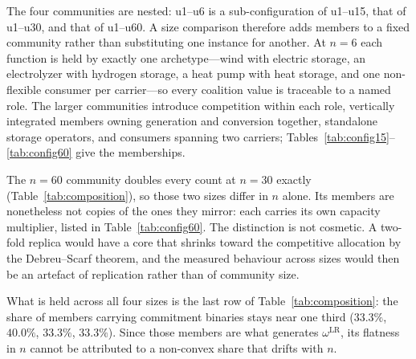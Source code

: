 The four communities are nested: u1--u6 is a sub-configuration of u1--u15, that of
u1--u30, and that of u1--u60. A size comparison therefore adds members to a fixed
community rather than substituting one instance for another. At $n=6$ each function is
held by exactly one archetype---wind with electric storage, an electrolyzer with
hydrogen storage, a heat pump with heat storage, and one non-flexible consumer per
carrier---so every coalition value is traceable to a named role. The larger communities
introduce competition within each role, vertically integrated members owning generation
and conversion together, standalone storage operators, and consumers spanning two
carriers; Tables~\ref{tab:config15}--\ref{tab:config60} give the memberships.

The $n=60$ community doubles every count at $n=30$ exactly (Table~\ref{tab:composition}),
so those two sizes differ in $n$ alone. Its members are nonetheless not copies of the
ones they mirror: each carries its own capacity multiplier, listed in
Table~\ref{tab:config60}. The distinction is not cosmetic. A two-fold replica would have
a core that shrinks toward the competitive allocation by the Debreu--Scarf theorem, and
the measured behaviour across sizes would then be an artefact of replication rather than
of community size.

What is held across all four sizes is the last row of Table~\ref{tab:composition}: the
share of members carrying commitment binaries stays near one third ($33.3\%$, $40.0\%$,
$33.3\%$, $33.3\%$). Since those members are what generates $\omega^{\mathrm{LR}}$, its
flatness in $n$ cannot be attributed to a non-convex share that drifts with $n$.

